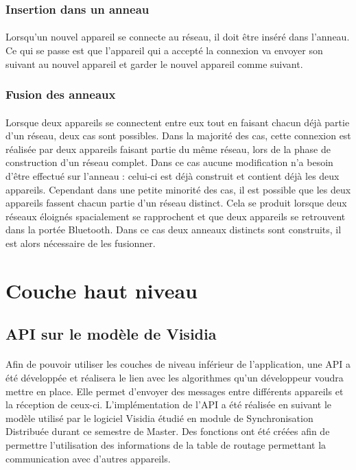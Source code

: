 \documentclass[a4paper,10pt]{report}
\begin{document}
      \subsubsection{Insertion dans un anneau}
      \paragraph{}
      Lorsqu'un nouvel appareil se connecte au réseau, il doit être inséré dans l'anneau. Ce qui se passe est que l'appareil qui a accepté la connexion va envoyer son suivant au nouvel appareil et garder le nouvel appareil comme suivant.
      
      \subsubsection{Fusion des anneaux}
      \paragraph{}
      Lorsque deux appareils se connectent entre eux tout en faisant chacun déjà partie d'un réseau, deux cas sont possibles. Dans la majorité des cas, cette connexion est réalisée par deux appareils faisant partie du même réseau, lors de la phase de construction d'un réseau complet. Dans ce cas aucune modification n'a besoin d'être effectué sur l'anneau : celui-ci est déjà construit et contient déjà les deux appareils. Cependant dans une petite minorité des cas, il est possible que les deux appareils fassent chacun partie d'un réseau distinct. Cela se produit lorsque deux réseaux éloignés spacialement se rapprochent et que deux appareils se retrouvent dans la portée Bluetooth. Dans ce cas deux anneaux distincts sont construits, il est alors nécessaire de les fusionner. 
      
  \section{Couche haut niveau}
    \subsection{API sur le modèle de Visidia}
    \paragraph{}
    Afin de pouvoir utiliser les couches de niveau inférieur de l'application, une API a été développée et réalisera le lien avec les algorithmes qu'un développeur voudra mettre en place.
    Elle permet d'envoyer des messages entre différents appareils et la réception de ceux-ci. L'implémentation de l'API a été réalisée en suivant le modèle utilisé par le logiciel Visidia étudié en module de Synchronisation Distribuée durant ce semestre de Master. Des fonctions ont été créées afin de permettre l'utilisation des informations de la table de routage permettant la communication avec d'autres appareils.
    
\end{document}
